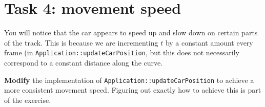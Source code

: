 \documentclass{../../../fal_assignment}
\begin{document}
\section*{Task 4: movement speed}

You will notice that the car appears to speed up and slow down on certain parts of the track.
This is because we are incrementing $t$ by a constant amount every frame (in \lstinline{Application::updateCarPosition}, but this does not necessarily
correspond to a constant distance along the curve.

\textbf{Modify} the implementation of \lstinline{Application::updateCarPosition} to achieve a more consistent movement speed.
Figuring out exactly how to achieve this is part of the exercise.

\end{document}
